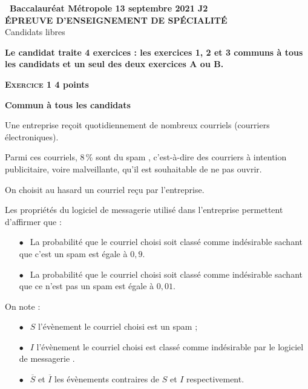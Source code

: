 \documentclass[11pt]{article}
\begin{document}
\setlength\parindent{0mm}
\pagestyle{fancy}
\thispagestyle{empty}

\begin{center}{\Large\textbf{\decofourleft~Baccalauréat Métropole 13 septembre 2021 J2~\decofourright\\[6pt] ÉPREUVE D'ENSEIGNEMENT DE SPÉCIALITÉ}\\[7pt]Candidats libres}
\end{center}

\vspace{0,25cm}

\textbf{Le candidat traite 4 exercices : les exercices 1, 2 et 3 communs à tous les candidats et un seul des deux exercices A ou B.}

\bigskip

\textbf{\textsc{Exercice 1} \hfill 4 points}

\textbf{Commun à tous les candidats}

\medskip

Une entreprise reçoit quotidiennement de nombreux courriels (courriers électroniques).

Parmi ces courriels, 8\,\% sont du \og spam \fg, c'est-à-dire des courriers à intention publicitaire, voire malveillante, qu'il est souhaitable de ne pas ouvrir.

On choisit au hasard un courriel reçu par l'entreprise.

Les propriétés du logiciel de messagerie utilisé dans l'entreprise permettent d'affirmer que :

\setlength\parindent{1cm}
\begin{itemize}
\item[$\bullet~~$]La probabilité que le courriel choisi soit classé comme \og indésirable\fg{} sachant que c'est un spam est égale à $0,9$.
\item[$\bullet~~$]La probabilité que le courriel choisi soit classé comme \og indésirable\fg{} sachant que ce n'est pas un spam est égale à $0,01$.
\end{itemize}
\setlength\parindent{0cm}

On note :

\setlength\parindent{1cm}
\begin{itemize}
\item[$\bullet~~$]$S$ l'évènement \og le courriel choisi est un spam \fg ;
\item[$\bullet~~$]$I$ l'évènement \og le courriel choisi est classé comme indésirable par le logiciel de messagerie \fg.
\item[$\bullet~~$]$\overline{S}$ et $\overline{I}$ les évènements contraires de $S$ et $I$ respectivement.
\end{itemize}
\setlength\parindent{0cm}
\end{document}
